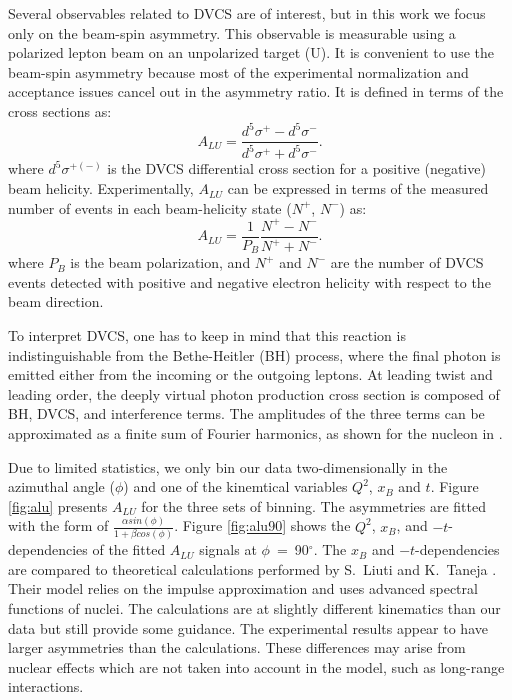 \documentclass[twocolumn,nofootinbib,showpacs,prl,superscriptaddress,secnumarabic,amssymb,nobibnotes,aps,floatfix]{revtex4}
\begin{document}
Several observables related to DVCS are of interest, but in this work we focus only 
on the beam-spin asymmetry. This  observable is measurable using a polarized 
lepton beam on an unpolarized target (U). It is convenient to use the beam-spin 
asymmetry because most of the experimental normalization and acceptance issues 
cancel out in the asymmetry ratio. It is defined in terms of the cross sections 
as:
  \begin{equation}
  A_{LU} = \frac{d^{5}\sigma^{+} - d^{5}\sigma^{-} }
                {d^{5}\sigma^{+} + d^{5}\sigma^{-}}.
    \label{BSA_equation}
  \end{equation}
where $d^{5}\sigma^{+(-)}$ is the DVCS differential cross 
section for a positive (negative) beam helicity. Experimentally, $A_{LU}$ 
can be expressed in terms of the measured number of events in each 
beam-helicity state ($N^{+}$, $N^{-}$) as:
\begin{equation}
A_{LU} = \frac{1}{P_{B}} \frac{N^{+} - N^{-}}{N^{+} + N^{-} }.
\end{equation}
where $P_{B}$ is the beam polarization, and $N^{+}$ and $N^{-}$ are the number 
of DVCS events detected with positive and negative electron helicity with 
respect to the beam direction. 

To interpret DVCS, one has to keep in mind that this reaction is 
indistinguishable from the Bethe-Heitler (BH) process, where the final photon 
is emitted either from the incoming or the outgoing leptons. At leading twist 
and leading order, the deeply virtual photon production cross section is 
composed of BH, DVCS, and interference terms. The amplitudes of the 
three terms can be approximated as a finite sum of Fourier harmonics, as shown 
for the nucleon in \cite{Belitsky:2001ns}. 

Due to limited statistics, we only bin  our data two-dimensionally 
 in the azimuthal angle ($\phi$) and one of the kinemtical variables 
$Q^{2}$, $x_{B}$ and $t$. Figure \ref{fig:alu} presents $A_{LU}$ for the three
sets of binning. The asymmetries are fitted with the form of $\frac{\alpha 
sin(\phi)}{1+ \beta cos(\phi)}$.  Figure \ref{fig:alu90} shows the $Q^2$, 
$x_{B}$, and $-t$-dependencies of the fitted $A_{LU}$ signals at 
$\phi$~=~90$^{\circ}$. The $x_{B}$ and $-t$-dependencies are compared to 
theoretical calculations performed by S.~Liuti and K.~Taneja 
\cite{simonetta_2}. Their model relies on the impulse approximation and uses 
advanced spectral functions of nuclei.  The calculations are at slightly 
different kinematics than our data but still provide some guidance. The 
experimental results appear to have larger asymmetries than the calculations.  
These differences may arise from nuclear effects which are not taken into 
account in the model, such as long-range interactions.
\end{document}
